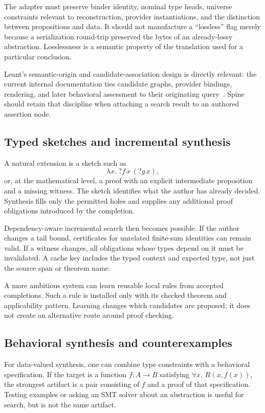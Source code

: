 \documentclass[11pt,letterpaper]{article}
\theoremstyle{definition}
\theoremstyle{remark}
\newcommand{\Spine}{Spine}
\begin{document}
The adapter must preserve binder identity, nominal type heads, universe constraints relevant to reconstruction, provider instantiations, and the distinction between propositions and data. It should not manufacture a ``lossless'' flag merely because a serialization round-trip preserved the bytes of an already-lossy abstraction. Losslessness is a semantic property of the translation used for a particular conclusion.

Leant's semantic-origin and candidate-association design is directly relevant: the current internal documentation ties candidate graphs, provider bindings, rendering, and later behavioral assessment to their originating query~\cite{synth-internals}. \Spine{} should retain that discipline when attaching a search result to an authored assertion node.

\subsection{Typed sketches and incremental synthesis}
A natural extension is a sketch such as
\[
 \lambda x.\;?f\,x\,(?g\,x),
\]
or, at the mathematical level, a proof with an explicit intermediate proposition and a missing witness. The sketch identifies what the author has already decided. Synthesis fills only the permitted holes and supplies any additional proof obligations introduced by the completion.

Dependency-aware incremental search then becomes possible. If the author changes a tail bound, certificates for unrelated finite-sum identities can remain valid. If a witness changes, all obligations whose types depend on it must be invalidated. A cache key includes the typed context and expected type, not just the source span or theorem name.

A more ambitious system can learn reusable local rules from accepted completions. Such a rule is installed only with its checked theorem and applicability pattern. Learning changes which candidates are proposed; it does not create an alternative route around proof checking.

\subsection{Behavioral synthesis and counterexamples}
For data-valued synthesis, one can combine type constraints with a behavioral specification. If the target is a function $f:A\to B$ satisfying $\forall x,\,R(x,f(x))$, the strongest artifact is a pair consisting of $f$ and a proof of that specification. Testing examples or asking an SMT solver about an abstraction is useful for search, but is not the same artifact.
\end{document}
